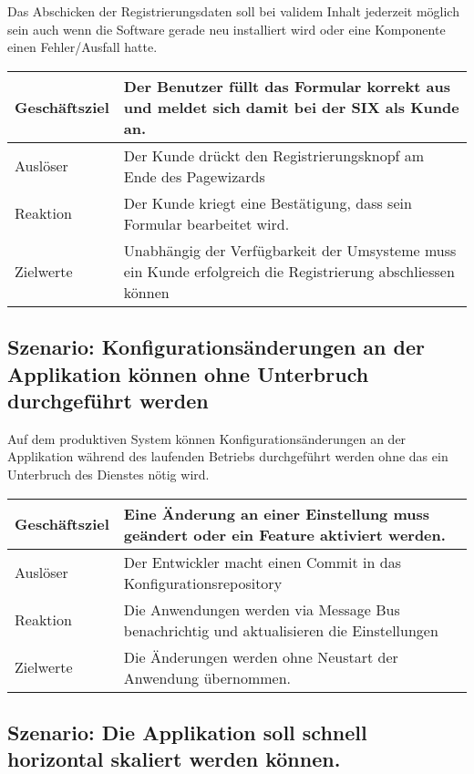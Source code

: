 Das Abschicken der Registrierungsdaten soll bei validem Inhalt jederzeit möglich sein auch wenn die Software gerade neu installiert wird oder eine Komponente einen Fehler/Ausfall hatte.

\begin{table}[H]
	\centering
	\begin{tabular}{ | p{3cm} | p{12cm} | }
		\toprule
		Geschäftsziel & Der Benutzer füllt das Formular korrekt aus und meldet sich damit bei der SIX als Kunde an. \\ \hline
		Auslöser & Der \Gls{Kunde} drückt den Registrierungsknopf am Ende des Pagewizards \\  \hline
		Reaktion & Der Kunde kriegt eine Bestätigung, dass sein Formular bearbeitet wird. \\ \hline
		Zielwerte & Unabhängig der Verfügbarkeit der Umsysteme muss ein Kunde erfolgreich die Registrierung abschliessen können \\
		\bottomrule
	\end{tabular}
\end{table}
\newpage

\subsection{Szenario: Konfigurationsänderungen an der Applikation können ohne Unterbruch durchgeführt werden}

Auf dem produktiven System können Konfigurationsänderungen an der Applikation während des laufenden Betriebs durchgeführt werden ohne das ein Unterbruch des Dienstes nötig wird.

\begin{table}[H]
	\centering
	\begin{tabular}{ | p{3cm} | p{12cm} | }
		\toprule
		Geschäftsziel & Eine Änderung an einer Einstellung muss geändert oder ein Feature aktiviert werden. \\ \hline
		Auslöser & Der Entwickler macht einen Commit in das Konfigurationsrepository\\ \hline
		Reaktion & Die Anwendungen werden via Message Bus benachrichtig und aktualisieren die Einstellungen \\ \hline
		Zielwerte & Die Änderungen werden ohne Neustart der Anwendung übernommen.\\
		\bottomrule
	\end{tabular}
\end{table}


\subsection{Szenario: Die Applikation soll schnell horizontal skaliert werden können.}

